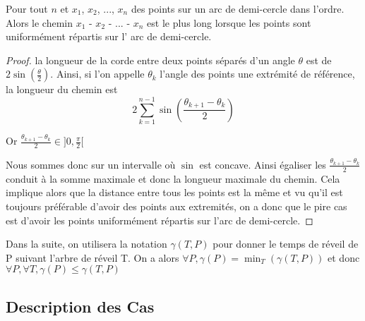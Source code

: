 \begin{lemma}\label{worstchord}
Pour tout $n$ et $x_1$, $x_2$, ..., $x_n$ des points sur un arc de demi-cercle dans l'ordre. Alors le chemin $x_1$ - $x_2$ - ... - $x_n$ est le plus long lorsque les points sont uniformément répartis sur l' arc de demi-cercle.
\end{lemma}
\begin{proof}
la longueur de la corde entre deux points séparés d'un angle $\theta$ est de $2\sin\left(\frac{\theta}{2}\right)$. Ainsi, si l'on appelle $\theta_k$ l'angle des points une extrémité de référence, la longueur du chemin est
$$2\sum_{k=1}^{n-1} \sin\left(\frac{\theta_{k+1} - \theta_k}{2}\right)$$

Or $\frac{\theta_{k+1} - \theta_k}{2} \in ]0, \frac{\pi}{2}[$

Nous sommes donc sur un intervalle où $\sin$ est concave. Ainsi égaliser les $\frac{\theta_{k+1} - \theta_k}{2}$ conduit à la somme maximale et donc la longueur maximale du chemin. 
Cela implique alors que la distance entre tous les points est la même et vu qu'il est toujours préférable d'avoir des points aux extremités, on a donc que le pire cas est d'avoir les points uniformément répartis sur l'arc de demi-cercle.

\end{proof}

Dans la suite, on utilisera la notation $\gamma(T, P)$ pour donner le temps de réveil de P suivant l'arbre de réveil T.
On a alors $\forall P, \gamma(P) = \min_T(\gamma(T,P))$
et donc $\forall P, \forall T, \gamma(P) \leq \gamma(T, P)$

\subsection{Description des Cas}

